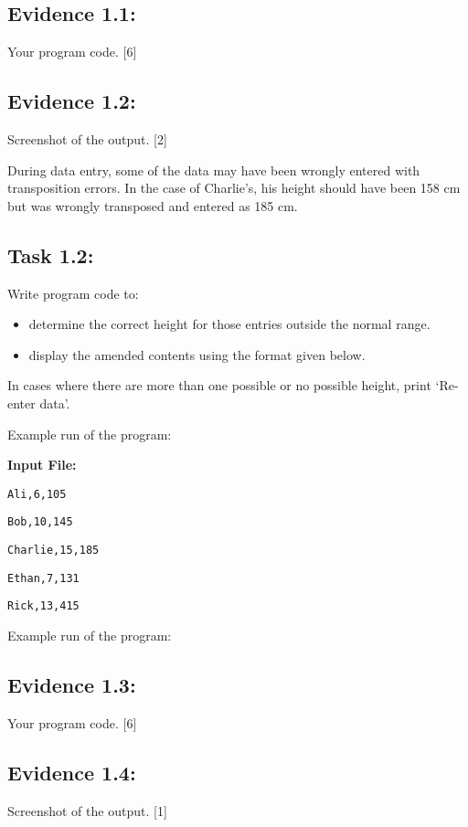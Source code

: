 \subsection*{Evidence 1.1: }

Your program code. \hfill{}{[}6{]}

\subsection*{Evidence 1.2: }

Screenshot of the output.\hfill{} {[}2{]}

During data entry, some of the data may have been wrongly entered
with transposition errors. In the case of Charlie\textquoteright s,
his height should have been 158 cm but was wrongly transposed and
entered as 185 cm. 

\subsection*{Task 1.2: }

Write program code to: 
\begin{itemize}
\item determine the correct height for those entries outside the normal
range. 
\item display the amended contents using the format given below. 
\end{itemize}
In cases where there are more than one possible or no possible height,
print \textquoteleft Re-enter data\textquoteright .

\noindent %
\begin{minipage}[t]{0.5\columnwidth}%
Example run of the program:

\textbf{Input File:}

\texttt{Ali,6,105}

\texttt{Bob,10,145 }

\texttt{Charlie,15,185 }

\texttt{Ethan,7,131 }

\texttt{Rick,13,415 }%
\end{minipage}%

Example run of the program: 

\subsection*{Evidence 1.3: }

Your program code. \hfill{}{[}6{]}

\subsection*{Evidence 1.4: }

Screenshot of the output. \hfill{}{[}1{]}